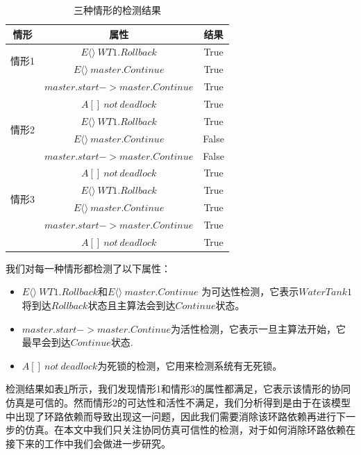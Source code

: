 \begin{table}
\caption{三种情形的检测结果}
\centering
\begin{tabular}{c c c} 
        \hline  
        情形 & 属性 & 结果\\
        \hline
        \multirow{2}{2.0cm}{情形1}  
                & $E\langle\rangle~WT1.Rollback$ & True\\ 
                & $E\langle\rangle~master.Continue$ & True\\ 
                & $master.start -> master.Continue$ & True\\ 
                & $A[]~not~deadlock$ & True\\   
        \hline 
        \multirow{2}{2.0cm}{情形2}  
                & $E\langle\rangle~WT1.Rollback$ & True\\ 
                & $E\langle\rangle~master.Continue$ & False\\ 
                & $master.start -> master.Continue$ & False\\ 
                & $A[]~not~deadlock$ & True\\   
        \hline 
        \multirow{2}{2.0cm}{情形3}  
                & $E\langle\rangle~WT1.Rollback$ & True\\ 
                & $E\langle\rangle~master.Continue$ & True\\ 
                & $master.start -> master.Continue$ & True\\ 
                & $A[]~not~deadlock$ & True\\   
        \hline 
\end{tabular} 
\label{rs}
\end{table}

我们对每一种情形都检测了以下属性：
\begin{itemize}
\item
$E\langle\rangle~WT1.Rollback$和$E\langle\rangle~master.Continue$ 为可达性检测，它表示$WaterTank1$将到达$Rollback$状态且主算法会到达$Continue$状态。
\item
$master.start -> master.Continue$为活性检测，它表示一旦主算法开始，它最早会到达$Continue$状态.
\item 
$A[]~not~deadlock$为死锁的检测，它用来检测系统有无死锁。
\end{itemize}

检测结果如表\ref{rs}所示，我们发现情形1和情形3的属性都满足，它表示该情形的协同仿真是可信的。然而情形2的可达性和活性不满足，我们分析得到是由于在该模型中出现了环路依赖而导致出现这一问题，因此我们需要消除该环路依赖再进行下一步的仿真。在本文中我们只关注协同仿真可信性的检测，对于如何消除环路依赖在接下来的工作中我们会做进一步研究。 


